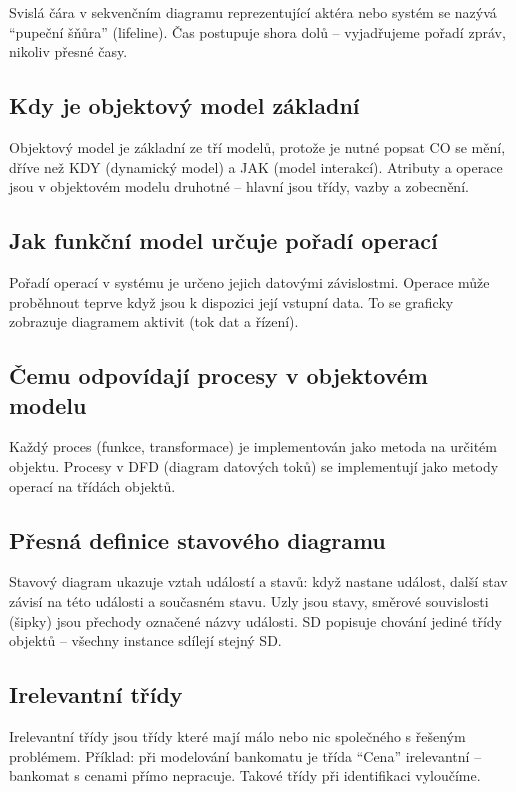 \documentclass[12pt, a4paper]{article}
\begin{document}
Svislá čára v sekvenčním diagramu reprezentující aktéra nebo systém se nazývá ``pupeční šňůra'' (lifeline). Čas postupuje shora dolů -- vyjadřujeme pořadí zpráv, nikoliv přesné časy.

\subsection{Kdy je objektový model základní}

Objektový model je základní ze tří modelů, protože je nutné popsat CO se mění, dříve než KDY (dynamický model) a JAK (model interakcí). Atributy a operace jsou v objektovém modelu druhotné -- hlavní jsou třídy, vazby a zobecnění.

\subsection{Jak funkční model určuje pořadí operací}

Pořadí operací v systému je určeno jejich datovými závislostmi. Operace může proběhnout teprve když jsou k dispozici její vstupní data. To se graficky zobrazuje diagramem aktivit (tok dat a řízení).

\subsection{Čemu odpovídají procesy v objektovém modelu}

Každý proces (funkce, transformace) je implementován jako metoda na určitém objektu. Procesy v DFD (diagram datových toků) se implementují jako metody operací na třídách objektů.

\subsection{Přesná definice stavového diagramu}

Stavový diagram ukazuje vztah událostí a stavů: když nastane událost, další stav závisí na této události a současném stavu. Uzly jsou stavy, směrové souvislosti (šipky) jsou přechody označené názvy události. SD popisuje chování jediné třídy objektů -- všechny instance sdílejí stejný SD.

\subsection{Irelevantní třídy}

Irelevantní třídy jsou třídy které mají málo nebo nic společného s řešeným problémem. Příklad: při modelování bankomatu je třída ``Cena'' irelevantní -- bankomat s cenami přímo nepracuje. Takové třídy při identifikaci vyloučíme.
\end{document}
